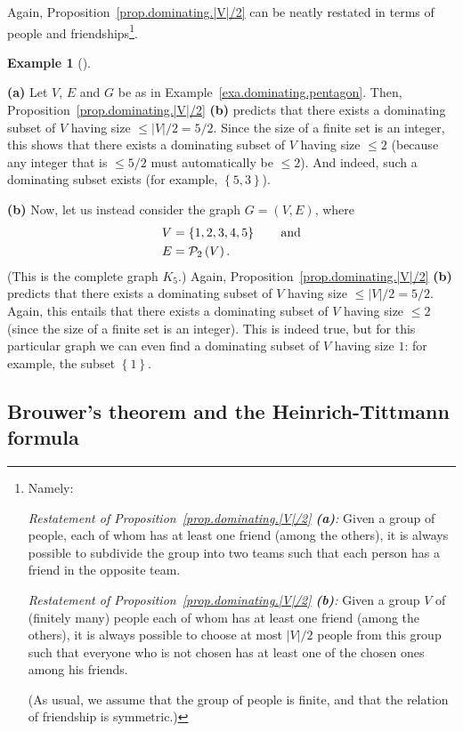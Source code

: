 \documentclass[numbers=enddot,12pt,final,onecolumn,notitlepage]{scrartcl}%
\theoremstyle{definition}
\newtheorem{exam}[theo]{Example}
\newenvironment{example}[1][]
{\begin{exam}[#1]\begin{leftbar}}
{\end{leftbar}\end{exam}}
\newcommand{\powset}[2][]{\ifthenelse{\equal{#2}{}}{\mathcal{P}\left(#1\right)}{\mathcal{P}_{#1}\left(#2\right)}}
\newcommand{\set}[1]{\left\{ #1 \right\}}
\newcommand{\abs}[1]{\left| #1 \right|}
\newcommand{\tup}[1]{\left( #1 \right)}
\begin{document}
Again, Proposition~\ref{prop.dominating.|V|/2} can be neatly restated
in terms of people and friendships\footnote{Namely:

\textit{Restatement of
Proposition~\ref{prop.dominating.|V|/2} \textbf{(a)}:} Given a group
of people, each of whom has at least one friend (among the others),
it is always possible to subdivide the group into two teams such that
each person has a friend in the opposite team.

\textit{Restatement of
Proposition~\ref{prop.dominating.|V|/2} \textbf{(b)}:} Given a group
$V$ of (finitely many) people each of whom has at least one friend
(among the others),
it is always possible to choose at most $\abs{V}/{2}$ people from this
group such that everyone who is not chosen has at least one of the
chosen ones among his friends.

(As usual, we assume that the group of people is finite, and that the
relation of friendship is symmetric.)}.

\begin{example}
\textbf{(a)} Let $V$, $E$ and $G$ be as in
Example~\ref{exa.dominating.pentagon}.
Then, Proposition~\ref{prop.dominating.|V|/2} \textbf{(b)} predicts
that there exists a dominating subset of $V$ having size
$\leq \abs{V}/2 = 5/2$. Since the size of a finite set is an integer,
this shows that there exists a dominating subset of $V$ having size
$\leq 2$ (because any integer that is $\leq 5/2$ must automatically be
$\leq 2$). And indeed, such a dominating subset exists
(for example, $\set{5, 3}$).

\textbf{(b)} Now, let us instead consider the graph $G = \tup{V, E}$,
where
\begin{align*}
V &= \set{1, 2, 3, 4, 5} \qquad \text{and} \\
E &= \powset[2]{V} .
\end{align*}
(This is the complete graph $K_5$.)
Again, Proposition~\ref{prop.dominating.|V|/2} \textbf{(b)} predicts
that there exists a dominating subset of $V$ having size
$\leq \abs{V}/2 = 5/2$. Again, this entails that
there exists a dominating subset of $V$ having size $\leq 2$ (since
the size of a finite set is an integer). This is indeed true, but for
this particular graph we can even find a dominating subset of $V$
having size $1$: for example, the subset $\set{1}$.
\end{example}

\subsection{\label{subsect.dominating.odd}Brouwer's theorem and the
Heinrich-Tittmann formula}
\end{document}
